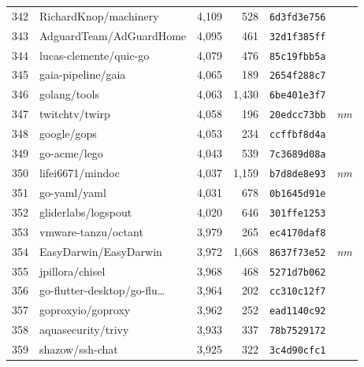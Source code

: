{\begin{supertabular}{llrrll}
        342 &              RichardKnop/machinery &  4,109 &    528 &  \texttt{6d3fd3e756} &              \\
        343 &            AdguardTeam/AdGuardHome &  4,095 &    461 &  \texttt{32d1f385ff} &              \\
        344 &             lucas-clemente/quic-go &  4,079 &    476 &  \texttt{85c19fbb5a} &              \\
        345 &                 gaia-pipeline/gaia &  4,065 &    189 &  \texttt{2654f288c7} &              \\
        346 &                       golang/tools &  4,063 &  1,430 &  \texttt{6be401e3f7} &              \\
        347 &                     twitchtv/twirp &  4,058 &    196 &  \texttt{20edcc73bb} &  \textit{nm} \\
        348 &                        google/gops &  4,053 &    234 &  \texttt{ccffbf8d4a} &              \\
        349 &                       go-acme/lego &  4,043 &    539 &  \texttt{7c3689d08a} &              \\
        350 &                   lifei6671/mindoc &  4,037 &  1,159 &  \texttt{b7d8de8e93} &  \textit{nm} \\
        351 &                       go-yaml/yaml &  4,031 &    678 &  \texttt{0b1645d91e} &              \\
        352 &                gliderlabs/logspout &  4,020 &    646 &  \texttt{301ffe1253} &              \\
        353 &                vmware-tanzu/octant &  3,979 &    265 &  \texttt{ec4170daf8} &              \\
        354 &              EasyDarwin/EasyDarwin &  3,972 &  1,668 &  \texttt{8637f73e52} &  \textit{nm} \\
        355 &                    jpillora/chisel &  3,968 &    468 &  \texttt{5271d7b062} &              \\
        356 &    go-flutter-desktop/go-flu\ldots &  3,964 &    202 &  \texttt{cc310c12f7} &              \\
        357 &                  goproxyio/goproxy &  3,962 &    252 &  \texttt{ead1140c92} &              \\
        358 &                 aquasecurity/trivy &  3,933 &    337 &  \texttt{78b7529172} &              \\
        359 &                    shazow/ssh-chat &  3,925 &    322 &  \texttt{3c4d90cfc1} &              \\

\end{supertabular}}

